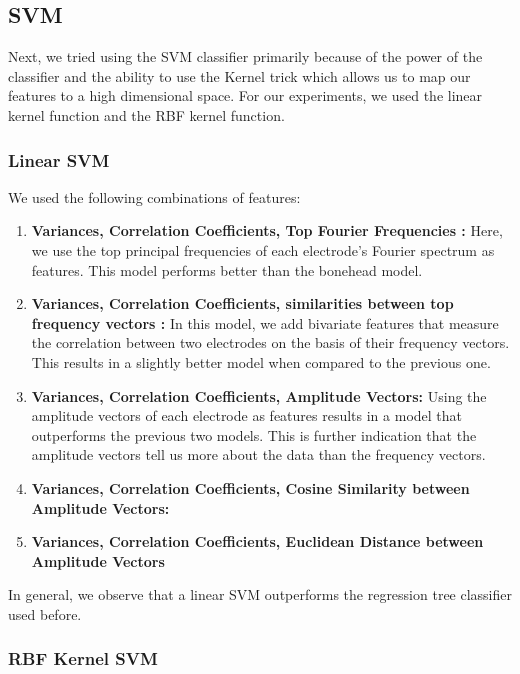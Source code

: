\documentclass[a4paper]{article}
\begin{document}
\subsection{SVM}
Next, we tried using the SVM classifier primarily because of the power of the classifier and the ability to use the Kernel trick which allows us to map our features to a high dimensional space. For our experiments, we used the linear kernel function and the RBF kernel function.

\subsubsection{Linear SVM}

We used the following combinations of features: 
\begin{enumerate}
\item \textbf{Variances, Correlation Coefficients, Top Fourier Frequencies :} Here, we use the top principal frequencies of each electrode's Fourier spectrum as features. This model performs better than the bonehead model.
\item \textbf{Variances, Correlation Coefficients, similarities between top frequency vectors :} In this model, we add bivariate features that measure the correlation between two electrodes on the basis of their frequency vectors. This results in a slightly better model when compared to the previous one.
\item \textbf{Variances, Correlation Coefficients, Amplitude Vectors:} Using the amplitude vectors of each electrode as features results in a model that outperforms the previous two models. This is further indication that the amplitude vectors tell us more about the data than the frequency vectors.
\item \textbf{Variances, Correlation Coefficients, Cosine Similarity between Amplitude Vectors:} 
\item \textbf{Variances, Correlation Coefficients, Euclidean Distance between Amplitude Vectors}
\end{enumerate}

In general, we observe that a linear SVM outperforms the regression tree classifier used before.


\subsubsection{RBF Kernel SVM}
\end{document}
